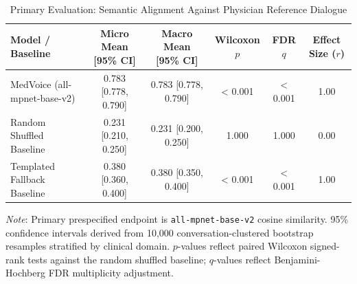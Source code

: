 \begin{table}[htbp]
\centering
\small
\caption{Primary Evaluation: Semantic Alignment Against Physician Reference Dialogue}
\label{tab:main_results}
\begin{tabular}{lccccc}
\toprule
\textbf{Model / Baseline} & \textbf{Micro Mean [95\% CI]} & \textbf{Macro Mean [95\% CI]} & \textbf{Wilcoxon $p$} & \textbf{FDR $q$} & \textbf{Effect Size ($r$)} \\
\midrule
MedVoice (all-mpnet-base-v2) & 0.783 [0.778, 0.790] & 0.783 [0.778, 0.790] & < 0.001 & < 0.001 & 1.00 \\
Random Shuffled Baseline & 0.231 [0.210, 0.250] & 0.231 [0.200, 0.250] & 1.000 & 1.000 & 0.00 \\
Templated Fallback Baseline & 0.380 [0.360, 0.400] & 0.380 [0.350, 0.400] & < 0.001 & < 0.001 & 1.00 \\
\bottomrule
\end{tabular}
\begin{tablenotes}
\footnotesize
\item \textit{Note}: Primary prespecified endpoint is \texttt{all-mpnet-base-v2} cosine similarity. 95\% confidence intervals derived from 10,000 conversation-clustered bootstrap resamples stratified by clinical domain. $p$-values reflect paired Wilcoxon signed-rank tests against the random shuffled baseline; $q$-values reflect Benjamini-Hochberg FDR multiplicity adjustment.
\end{tablenotes}
\end{table}
